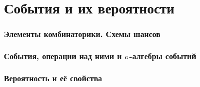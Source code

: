 
\usepackage{setspace}
\usepackage{amsmath, amssymb}
\newcommand{\noo}{\varnothing}
\usepackage{amsthm}
\DeclareMathOperator{\sinc}{sinc}

\newtheorem{mydef}{Определение}[section]

\newtheorem{theorem}{Теорема}[section]

\newtheorem{lemma}[theorem]{Лемма}%

\theoremstyle{definition}
\newtheorem{consq}[theorem]{Следствие}%
\newtheorem{definition}[theorem]{Определение}%
\newtheorem{zam}[theorem]{Замечание}

\theoremstyle{remark}
\newtheorem{remark}[theorem]{Замечание}%






\def\labauthors{}
\def\labgroup{}
\def\labnumber{}
\def\labtheme{}
\renewcommand{\vec}{\mathbf}
\renewcommand{\Re}{\operatorname{Re}}
\renewcommand{\Im}{\operatorname{Im}}
\renewcommand{\phi}{\varphi}
\renewcommand{\kappa}{\varkappa}
\renewcommand{\hat}{\widehat}

\begin{spacing}{1}
\tableofcontents
\end{spacing}
\newpage


\part{События и их вероятности}

\section{Элементы комбинаторики. Схемы шансов}


\section{События, операции над ними и $\sigma$-алгебры событий}




\section{Вероятность и её свойства}


